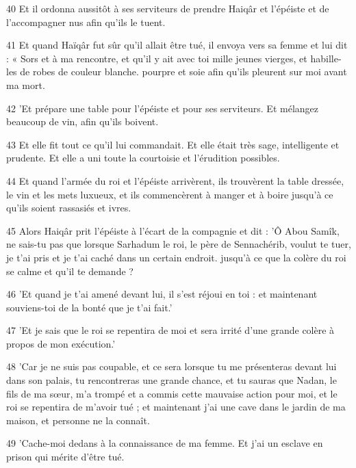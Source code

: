 \par 40 Et il ordonna aussitôt à ses serviteurs de prendre Haiqâr et l'épéiste et de l'accompagner nus afin qu'ils le tuent.

\par 41 Et quand Haïqâr fut sûr qu'il allait être tué, il envoya vers sa femme et lui dit : « Sors et à ma rencontre, et qu'il y ait avec toi mille jeunes vierges, et habille-les de robes de couleur blanche. pourpre et soie afin qu'ils pleurent sur moi avant ma mort.

\par 42 'Et prépare une table pour l'épéiste et pour ses serviteurs. Et mélangez beaucoup de vin, afin qu'ils boivent.

\par 43 Et elle fit tout ce qu'il lui commandait. Et elle était très sage, intelligente et prudente. Et elle a uni toute la courtoisie et l'érudition possibles.

\par 44 Et quand l'armée du roi et l'épéiste arrivèrent, ils trouvèrent la table dressée, le vin et les mets luxueux, et ils commencèrent à manger et à boire jusqu'à ce qu'ils soient rassasiés et ivres.

\par 45 Alors Haiqâr prit l'épéiste à l'écart de la compagnie et dit : 'Ô Abou Samîk, ne sais-tu pas que lorsque Sarhadum le roi, le père de Sennachérib, voulut te tuer, je t'ai pris et je t'ai caché dans un certain endroit. jusqu'à ce que la colère du roi se calme et qu'il te demande ?

\par 46 'Et quand je t'ai amené devant lui, il s'est réjoui en toi : et maintenant souviens-toi de la bonté que je t'ai fait.'

\par 47 'Et je sais que le roi se repentira de moi et sera irrité d'une grande colère à propos de mon exécution.'

\par 48 'Car je ne suis pas coupable, et ce sera lorsque tu me présenteras devant lui dans son palais, tu rencontreras une grande chance, et tu sauras que Nadan, le fils de ma sœur, m'a trompé et a commis cette mauvaise action pour moi, et le roi se repentira de m'avoir tué ; et maintenant j'ai une cave dans le jardin de ma maison, et personne ne la connaît.

\par 49 'Cache-moi dedans à la connaissance de ma femme. Et j'ai un esclave en prison qui mérite d'être tué.

